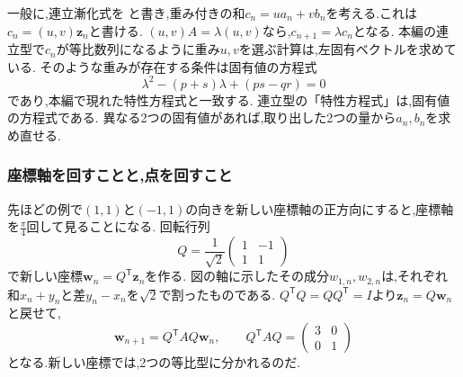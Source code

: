 一般に,連立漸化式を
\BookMathLayout{\[
  \boldsymbol{z}_{n+1}=A\boldsymbol{z}_n,\qquad
  \boldsymbol{z}_n=\begin{pmatrix}a_n\\b_n\end{pmatrix},\qquad
  A=\begin{pmatrix}p&q\\r&s\end{pmatrix}
\]}{\[
  \begin{aligned}
    &\boldsymbol{z}_{n+1}=A\boldsymbol{z}_n,\\
    &\boldsymbol{z}_n=\begin{pmatrix}a_n\\b_n\end{pmatrix},\quad
    A=\begin{pmatrix}p&q\\r&s\end{pmatrix}
  \end{aligned}
\]}
と書き,重み付きの和$c_n=u a_n+v b_n$を考える.これは$c_n=(u,v)\boldsymbol z_n$と書ける.
$(u,v)A=\lambda(u,v)$なら,$c_{n+1}=\lambda c_n$となる.
本編の連立型で$c_n$が等比数列になるように重み$u,v$を選ぶ計算は,左固有ベクトルを求めている.
そのような重みが存在する条件は固有値の方程式
\[
  \lambda^2-(p+s)\lambda+(ps-qr)=0
\]
であり,本編で現れた特性方程式と一致する.
連立型の「特性方程式」は,固有値の方程式である.
異なる2つの固有値があれば,取り出した2つの量から$a_n,b_n$を求め直せる.

\subsubsection{座標軸を回すことと,点を回すこと}
先ほどの例で$(1,1)$と$(-1,1)$の向きを新しい座標軸の正方向にすると,座標軸を$\frac{\pi}{4}$回して見ることになる.
\BookFigSystem
回転行列
\[
  Q=\frac{1}{\sqrt2}
  \begin{pmatrix}
    1&-1\\
    1&1
  \end{pmatrix}
\]
で新しい座標$\boldsymbol w_n=Q^{\mathsf T}\boldsymbol z_n$を作る.
図の軸に示したその成分$w_{1,n},w_{2,n}$は,それぞれ和$x_n+y_n$と差$y_n-x_n$を$\sqrt2$で割ったものである.
$Q^{\mathsf T}Q=QQ^{\mathsf T}=I$より$\boldsymbol z_n=Q\boldsymbol w_n$と戻せて,
\[
  \boldsymbol w_{n+1}
  =Q^{\mathsf T}AQ\boldsymbol w_n,
  \qquad
  Q^{\mathsf T}AQ=
  \begin{pmatrix}3&0\\0&1\end{pmatrix}
\]
となる.新しい座標では,2つの等比型に分かれるのだ.

